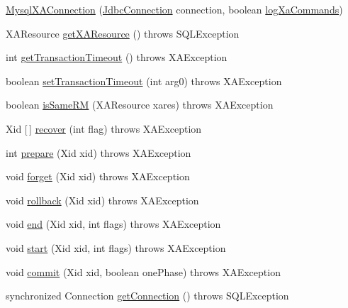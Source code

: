\begin{DoxyCompactItemize}
\item 
\mbox{\hyperlink{classcom_1_1mysql_1_1cj_1_1jdbc_1_1_mysql_x_a_connection_ab6bc1b1d3cad547e542c44bdc591e581}{Mysql\+X\+A\+Connection}} (\mbox{\hyperlink{interfacecom_1_1mysql_1_1cj_1_1jdbc_1_1_jdbc_connection}{Jdbc\+Connection}} connection, boolean \mbox{\hyperlink{classcom_1_1mysql_1_1cj_1_1jdbc_1_1_mysql_x_a_connection_a9e3e1df1f4dee55cf52612e8fe85eabf}{log\+Xa\+Commands}})
\item 
X\+A\+Resource \mbox{\hyperlink{classcom_1_1mysql_1_1cj_1_1jdbc_1_1_mysql_x_a_connection_ae8f9497d327b131871bfefe4a8ae6c9d}{get\+X\+A\+Resource}} ()  throws S\+Q\+L\+Exception 
\item 
int \mbox{\hyperlink{classcom_1_1mysql_1_1cj_1_1jdbc_1_1_mysql_x_a_connection_ae2dc2f285e5de1d56599f992ede4c71d}{get\+Transaction\+Timeout}} ()  throws X\+A\+Exception 
\item 
boolean \mbox{\hyperlink{classcom_1_1mysql_1_1cj_1_1jdbc_1_1_mysql_x_a_connection_a248a14335113b2cf9289db82c977db9c}{set\+Transaction\+Timeout}} (int arg0)  throws X\+A\+Exception 
\item 
boolean \mbox{\hyperlink{classcom_1_1mysql_1_1cj_1_1jdbc_1_1_mysql_x_a_connection_a6f7627c2098ba19cd1e9cd3162b7dbe6}{is\+Same\+RM}} (X\+A\+Resource xares)  throws X\+A\+Exception 
\item 
Xid \mbox{[}$\,$\mbox{]} \mbox{\hyperlink{classcom_1_1mysql_1_1cj_1_1jdbc_1_1_mysql_x_a_connection_ae272df21634f0f4a88b12cae093e9831}{recover}} (int flag)  throws X\+A\+Exception 
\item 
int \mbox{\hyperlink{classcom_1_1mysql_1_1cj_1_1jdbc_1_1_mysql_x_a_connection_a813bc9c4ead81e9da2835fa2d57246a1}{prepare}} (Xid xid)  throws X\+A\+Exception 
\item 
void \mbox{\hyperlink{classcom_1_1mysql_1_1cj_1_1jdbc_1_1_mysql_x_a_connection_ab11b3a86e81d0c3ecc236c620939aabf}{forget}} (Xid xid)  throws X\+A\+Exception 
\item 
void \mbox{\hyperlink{classcom_1_1mysql_1_1cj_1_1jdbc_1_1_mysql_x_a_connection_a0b19cab042f62f44adf248e080ea39b7}{rollback}} (Xid xid)  throws X\+A\+Exception 
\item 
void \mbox{\hyperlink{classcom_1_1mysql_1_1cj_1_1jdbc_1_1_mysql_x_a_connection_a6f20466a27da1aa3a0e5dabb3255d49b}{end}} (Xid xid, int flags)  throws X\+A\+Exception 
\item 
void \mbox{\hyperlink{classcom_1_1mysql_1_1cj_1_1jdbc_1_1_mysql_x_a_connection_abcfd20e77b38e5a5a28fba5c841c2279}{start}} (Xid xid, int flags)  throws X\+A\+Exception 
\item 
void \mbox{\hyperlink{classcom_1_1mysql_1_1cj_1_1jdbc_1_1_mysql_x_a_connection_a8ce071c6596c3f33c815fbe697fd619c}{commit}} (Xid xid, boolean one\+Phase)  throws X\+A\+Exception 
\item 
synchronized Connection \mbox{\hyperlink{classcom_1_1mysql_1_1cj_1_1jdbc_1_1_mysql_x_a_connection_a0907b211fc78dda2fe38e381a74b4d7c}{get\+Connection}} ()  throws S\+Q\+L\+Exception 
\end{DoxyCompactItemize}
